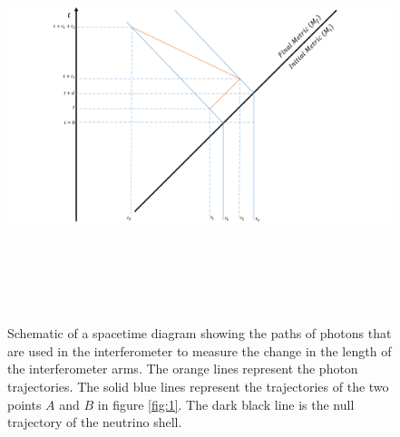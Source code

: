 \documentclass[aps,showpacs,onecolumn,floats,prd,superscriptaddress,nofootinbib]{revtex4-1}
\begin{document}
\begin{figure}[h]
\begin{center}
\includegraphics[width =\textwidth, height = 12cm]{calculation.pdf}
\caption{Schematic of a spacetime diagram showing the paths of photons that are used in the interferometer to measure the change in the length of the interferometer arms. The orange lines represent the photon trajectories. The solid blue lines represent the trajectories of the two points $A$ and $B$ in figure \ref{fig:1}. The dark black line is the null trajectory of the neutrino shell.}
\label{fig:2}
\end{center}
\end{figure}
\end{document}
